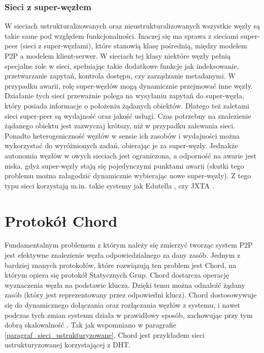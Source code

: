 \documentclass[12pt, twoside, openany]{report}
\begin{document}
\subsection{Sieci z super-węzłem}
W sieciach ustrukturalizowanych oraz nieustrukturalizowanych wszystkie węzły są takie same pod względem funkcjonalności. Inaczej się ma sprawa z sieciami super-peer (sieci z super-węzłami), które stanowią klasę pośrednią, między modelem P2P a modelem klient-serwer. W sieciach tej klasy niektóre węzły pełnią specjalne role w sieci, spełniając takie dodatkowe funkcje jak indeksowanie, przetwarzanie zapytań, kontrola dostępu, czy zarządzanie metadanymi. W przypadku awarii, rolę super-węzłów mogą dynamicznie przejmować inne węzły. Działanie tych sieci przeważnie polega na wysyłaniu zapytań do super-węzła, który posiada informacje o położeniu żądanych obiektów. Dlatego też zaletami sieci super-peer są wydajność oraz jakość usługi. Czas potrzebny na znalezienie żądanego obiektu jest zazwyczaj krótszy, niż w przypadku zalewania sieci. Ponadto heterogeniczność węzłów w sensie ich zasobów i wydajności można wykorzystać do wyróżnionych zadań, obierając je za super-węzły. Jednakże autonomia węzłów w owych sieciach jest ograniczona, a odporność na awarie jest niska, gdyż super-węzły stają się pojedynczymi punktami awarii (skutki tego problemu można załagodzić dynamicznie wybierając nowe super-węzły). Z tego typu sieci korzystają m.in. takie systemy jak Edutella \cite{bib:edutella}, czy JXTA \cite{bib:jxta}.


\chapter{Protokół Chord}
\label{rozdzial_chord}

Fundamentalnym problemem z którym należy się zmierzyć tworząc system P2P jest efektywne znalezienie węzła odpowiedzialnego za dany zasób. Jednym z bardziej znanych protokołów, które rozwiązują ten problem jest Chord, na którym opiera się protokół Statycznych Grup. Chord dostarcza operację wyznaczenia węzła na podstawie klucza. Dzięki temu można odnaleźć żądany zasób (który jest reprezentowany przez odpowiedni klucz). Chord dostosowywuje się do dynamicznego dołączania oraz rozłączania węzłów z systemu, i nawet podczas tych zmian systemu działa w prawidłowy sposób, zachowując przy tym dobrą skalowalność \cite{bib:chord}. Tak jak wspomniano w paragrafie \ref{paragraf_sieci_ustrukturyzowane}, Chord jest przykładem sieci ustrukturyzowanej korzystającej z DHT.
\end{document}
